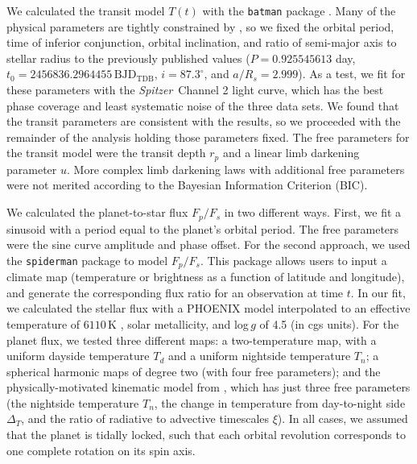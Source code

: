 \documentclass[twocolumn]{aastex61}
\newcommand{\project}[1]{\textsl{#1}}
\newcommand{\Spitzer}{\project{Spitzer}}
\begin{document}
We calculated the transit model $T(t)$ with the \texttt{batman} package \citep{kreidberg15a}. Many of the physical parameters are tightly constrained by \cite{southworth15}, so we fixed the orbital period, time of inferior conjunction, orbital inclination, and ratio of semi-major axis to stellar radius to the previously published values ($P = 0.925545613$ day, $t_0 = 2456836.2964455\,\mathrm{BJD_{TDB}}$, $i = 87.3^\circ$, and $a/R_s = 2.999$). As a test, we fit for these parameters with the \Spitzer\ Channel 2 light curve, which has the best phase coverage and least systematic noise of the three data sets. We found that the transit parameters are consistent with the \cite{southworth15} results, so we proceeded with the remainder of the analysis holding those parameters fixed.  The free parameters for the transit model were the transit depth $r_p$ and a linear limb darkening parameter $u$. More complex limb darkening laws with additional free parameters were not merited according to the Bayesian Information Criterion (BIC).

We calculated the planet-to-star flux $F_p/F_s$ in two different ways. First, we fit a sinusoid with a period equal to the planet's orbital period. The free parameters were the sine curve amplitude and phase offset. For the second approach, we used the \texttt{spiderman} package \citep{louden17} to model $F_p/F_s$. This package allows users to input a climate map (temperature or brightness as a function of latitude and longitude), and generate the corresponding flux ratio for an observation at time $t$. In our fit, we calculated the stellar flux with a PHOENIX model \citep{husser13} interpolated to an effective temperature of $6110\,\mathrm{K}$ \citep{gillon14}, solar metallicity, and log\,$g$ of 4.5 (in cgs units).  For the planet flux, we tested three different maps: a two-temperature map, with a uniform dayside temperature $T_d$ and a uniform nightside temperature $T_n$; a spherical harmonic maps of degree two (with four free parameters); and the physically-motivated kinematic model from \cite{zhang17}, which has just three free parameters (the nightside temperature $T_n$, the change in temperature from day-to-night side $\Delta_T$, and the ratio of radiative to advective timescales $\xi$).  In all cases, we assumed that the planet is tidally locked, such that each orbital revolution corresponds to one complete rotation on its spin axis. 
\end{document}
